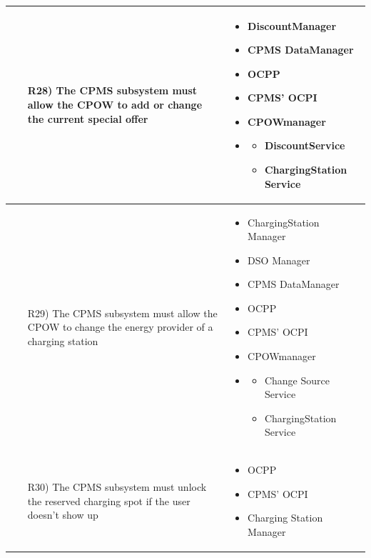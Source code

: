 \documentclass[table, 12pt]{article}
\begin{document}
\begin{longtable}{|p{}|p{}|}
    \begin{itemize}
        \item[R28)] The CPMS subsystem must allow the CPOW to add or change the current special offer
    \end{itemize}
        & 
    \begin{itemize}
        \item DiscountManager
        \item CPMS DataManager
        \item OCPP
        \item CPMS' OCPI
        \item CPOWmanager
        \item \begin{itemize}\setlength{\itemindent}{-5px}
            \item DiscountService
            \item ChargingStation Service
        \end{itemize}
    \end{itemize}
    \\\hline

    \begin{itemize}
        \item[R29)] The CPMS subsystem must allow the CPOW to change the energy provider of a charging station
    \end{itemize}
    & 
    \begin{itemize}
        \item ChargingStation Manager
        \item DSO Manager
        \item CPMS DataManager
        \item OCPP
        \item CPMS' OCPI
        \item CPOWmanager
        \item \begin{itemize}\setlength{\itemindent}{-5px}
            \item Change Source Service
            \item ChargingStation Service
        \end{itemize}
    \end{itemize}
    \\\hline

    \begin{itemize}
        \item[R30)] The CPMS subsystem must unlock the reserved charging spot if the user doesn't show up
    \end{itemize}
    & 
    \begin{itemize}
        \item OCPP
        \item CPMS' OCPI
        \item Charging Station Manager
    \end{itemize}
    \\\hline
\end{longtable}
\end{document}
